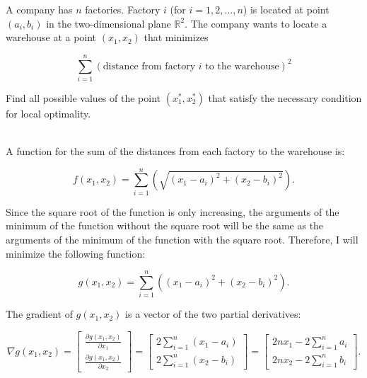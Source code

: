 \begin{homeworkProblem}
    A company has $n$ factories. Factory $i$ (for $i=1,2,...,n$) is located at 
    point $(a_i,b_i)$ in the two-dimensional plane $\mathbb R^2$. The company 
    wants to locate a warehouse at a point $(x_1,x_2)$ that minimizes 
    
    \begin{equation}
        \nonumber
        \sum_{i=1}^n (\text{distance from factory } i \text{ to the warehouse})^2
    \end{equation}
    
    Find all possible values of the point  $(x_1^*,x_2^*)$ that satisfy the 
    necessary condition for local optimality. 
    \\ \\
    \begin{solution}  
        A function for the sum of the distances from each factory to the warehouse is:
        
        \[
            f(x_1, x_2) = \sum_{i=1}^n \left(\sqrt{(x_1 - a_i)^2 + (x_2 - b_i)^2}\right).
        \]

        Since the square root of the function is only increasing, the arguments 
        of the minimum of the function without the square root will be the same as
        the arguments of the minimum of the function with the square root. Therefore,
        I will minimize the following function:

        \[
            g(x_1, x_2) = \sum_{i=1}^n \left((x_1 - a_i)^2 + (x_2 - b_i)^2\right).
        \]

        The gradient of $g(x_1, x_2)$ is a vector of the two partial derivatives:

        \[
            \nabla g(x_1, x_2) = 
            \begin{bmatrix}
                \frac{\partial g(x_1, x_2)}{\partial x_1} \\
                \frac{\partial g(x_1, x_2)}{\partial x_2}
            \end{bmatrix}
            =
            \begin{bmatrix}
                2\sum_{i=1}^n (x_1 - a_i) \\
                2\sum_{i=1}^n (x_2 - b_i)
            \end{bmatrix}
            =
            \begin{bmatrix}
                2n x_1 - 2\sum_{i=1}^n a_i \\
                2n x_2 - 2\sum_{i=1}^n b_i
            \end{bmatrix}.
        \]


\end{solution}
\end{homeworkProblem}
